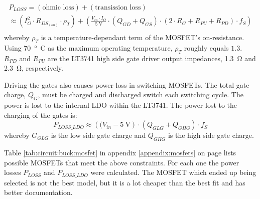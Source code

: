 \begin{multline}
    P_{LOSS} = (\textrm{ohmic loss}) + (\textrm{transission loss}) \\
             \approx \left( I_O^2 \cdot R_{DS_{(on)}} \cdot \rho_T \right)
                    + \left( \frac{V_{in} \cdot I_O}{\SI{5}{\volt}} \cdot \left(Q_{GD} + Q_{GS} \right) \cdot \left( 2 \cdot R_G + R_{PU} + R_{PD} \right) \cdot f_S \right) \\
    \label{eq:circuit:buck:mosfet_ploss}
\end{multline}
whereby   $\rho_T$   is  a   temperature-dependant   term   of  the   MOSFET's
on-resistance.  Using \SI{70}{\degree C} as the maximum operating temperature,
$\rho_T$  roughly equals  $1.3$.  $R_{PD}$  and $R_{PU}$  are the  LT3741 high
side  gate  driver  output   impedances,  \SI{1.3}{\ohm}  and  \SI{2.3}{\ohm},
respectively.

Driving the gates also causes power loss in switching MOSFETs.  The total gate
charge, $Q_G$, must be charged and discharged switch each switching cycle. The
power is  lost to the internal  LDO within the  LT3741. The power lost  to the
charging of the gates is:
\begin{equation}
    P_{LOSS\_LDO} \approx \left( (V_{in} - \SI{5}{\volt} \right) \cdot \left( Q_{GLG} + Q_{GHG} \right) \cdot f_S
    \label{eq:circuit:buck:switching_loss}
\end{equation}
whereby $G_{GLG}$ is the  low side gate charge and $Q_{GHG}$  is the high side
gate charge.

Table  \ref{tab:circuit:buck:mosfet}  in  appendix  \ref{appendix:mosfets}  on
page  \pageref{appendix:mosfets} lists  possible MOSFETs  that meet  the above
constraints.  For  each one  the power  losses $P_{LOSS}$  and $P_{LOSS\_LDO}$
were calculated. The  MOSFET which  ended up  being selected  is not  the best
model, but it is a lot cheaper than the best fit and has better documentation.
